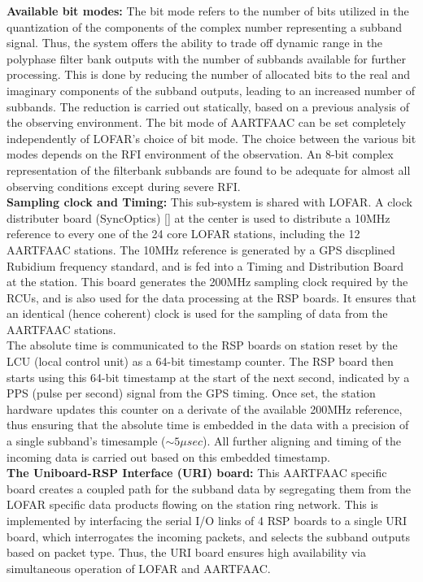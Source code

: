 \documentclass{ws-jai}
\begin{document}
\noindent \textbf  {Available bit modes:} The  bit mode refers to  the number of
bits  utilized in  the  quantization of  the components  of  the complex  number
representing a subband signal.  Thus, the system offers the ability to trade off
dynamic range in  the polyphase filter bank outputs with  the number of subbands
available  for further  processing.   This is  done by  reducing  the number  of
allocated bits  to the  real and  imaginary components  of the  subband outputs,
leading  to an  increased  number of  subbands.  The  reduction  is carried  out
statically, based on a previous analysis  of the observing environment.  The bit
mode of  AARTFAAC can be set  completely independently of LOFAR's  choice of bit
mode. The choice between the various bit modes depends on the RFI environment of
the observation.  An 8-bit complex representation of the filterbank subbands are
found to  be adequate for almost  all observing conditions except  during severe
RFI.\\


\noindent \textbf  {Sampling clock and  Timing:} This sub-system is  shared with
LOFAR. A  clock distributer board (SyncOptics)  \ref{} at the center  is used to
distribute  a 10MHz  reference  to every  one  of the  24  core LOFAR  stations,
including the 12  AARTFAAC stations.  The 10MHz reference is  generated by a GPS
discplined  Rubidium  frequency   standard,  and  is  fed  into   a  Timing  and
Distribution  Board at  the station.  This board  generates the  200MHz sampling
clock required by the RCUs, and is also  used for the data processing at the RSP
boards. It  ensures that  an identical  (hence coherent) clock  is used  for the
sampling of data from the AARTFAAC stations.\\

The absolute time is communicated to the  RSP boards on station reset by the LCU
(local control  unit) as a 64-bit  timestamp counter. The RSP  board then starts
using this 64-bit timestamp at the start  of the next second, indicated by a PPS
(pulse per second)  signal from the GPS timing.  Once  set, the station hardware
updates  this counter  on a  derivate of  the available  200MHz reference,  thus
ensuring that the  absolute time is embedded  in the data with a  precision of a
single subband's timesample ($\sim5\mu sec$). All  further aligning and timing of
the incoming data is carried out based on this embedded timestamp.\\

\noindent  \textbf  {The  Uniboard-RSP  Interface (URI)  board:}  This  AARTFAAC
specific board creates  a coupled path for the subband  data by segregating them
from the LOFAR specific data products  flowing on the station ring network. This
is implemented by interfacing  the serial I/O links of 4 RSP  boards to a single
URI  board, which  interrogates the  incoming packets,  and selects  the subband
outputs based on packet type. Thus,  the URI board ensures high availability via
simultaneous operation of LOFAR and  AARTFAAC.
\end{document}
